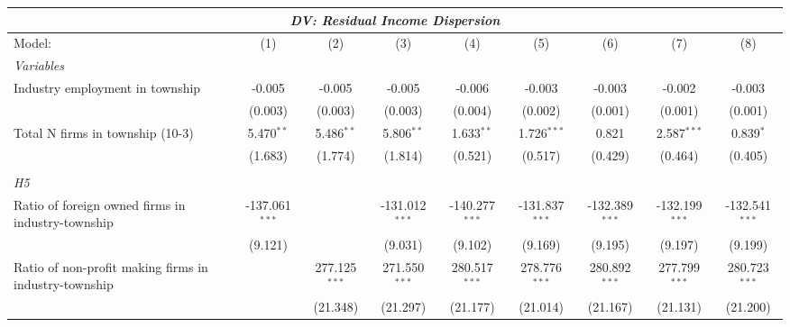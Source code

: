 \begingroup
\centering
\begin{tabular}{lcccccccc}
   \tabularnewline \multicolumn{9}{c}{\textit{DV: Residual Income Dispersion}} \\ \midrule \midrule
   Model:                                                & (1)              & (2)             & (3)              & (4)              & (5)              & (6)              & (7)              & (8)\\  
   \midrule
   \emph{Variables}\\
   Industry employment in township                       & -0.005           & -0.005          & -0.005           & -0.006           & -0.003           & -0.003           & -0.002           & -0.003\\   
                                                         & (0.003)          & (0.003)         & (0.003)          & (0.004)          & (0.002)          & (0.001)          & (0.001)          & (0.001)\\   
   Total N firms in township (10-3)                      & 5.470$^{**}$     & 5.486$^{**}$    & 5.806$^{**}$     & 1.633$^{**}$     & 1.726$^{***}$    & 0.821            & 2.587$^{***}$    & 0.839$^{*}$\\   
                                                         & (1.683)          & (1.774)         & (1.814)          & (0.521)          & (0.517)          & (0.429)          & (0.464)          & (0.405)\\   
\hdashline %
\\[0.1ex] %
\emph{H5} \\ 
   Ratio of foreign owned firms in industry-township     & -137.061$^{***}$ &                 & -131.012$^{***}$ & -140.277$^{***}$ & -131.837$^{***}$ & -132.389$^{***}$ & -132.199$^{***}$ & -132.541$^{***}$\\   
                                                         & (9.121)          &                 & (9.031)          & (9.102)          & (9.169)          & (9.195)          & (9.197)          & (9.199)\\   
   Ratio of non-profit making firms in industry-township &                  & 277.125$^{***}$ & 271.550$^{***}$  & 280.517$^{***}$  & 278.776$^{***}$  & 280.892$^{***}$  & 277.799$^{***}$  & 280.723$^{***}$\\   
                                                         &                  & (21.348)        & (21.297)         & (21.177)         & (21.014)         & (21.167)         & (21.131)         & (21.200)\\   

\end{tabular}
